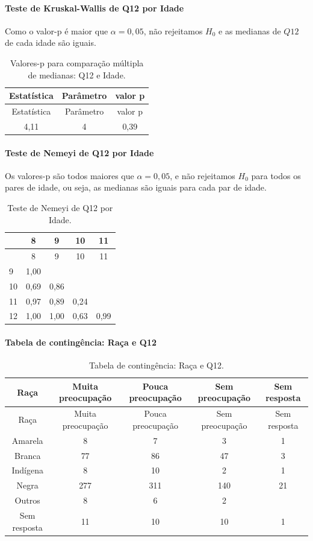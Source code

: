\documentclass[]{article}
\let\oldparagraph\paragraph
\renewcommand{\paragraph}[1]{\oldparagraph{#1}\mbox{}}
\begin{document}
\hypertarget{teste-de-kruskal-wallis-de-q12-por-idade}{%
\paragraph{Teste de Kruskal-Wallis de Q12 por Idade}\label{teste-de-kruskal-wallis-de-q12-por-idade}}

Como o valor-p é maior que \(\alpha=0,05\), não rejeitamos \(H_0\) e as medianas de \(Q12\) de cada idade são iguais.

\begin{longtable}[]{@{}ccc@{}}
\caption{\label{tab:unnamed-chunk-36}Valores-p para comparação múltipla de medianas: Q12 e Idade.}\tabularnewline
\toprule
Estatística & Parâmetro & valor p\tabularnewline
\midrule
\endfirsthead
\toprule
Estatística & Parâmetro & valor p\tabularnewline
\midrule
\endhead
4,11 & 4 & 0,39\tabularnewline
\bottomrule
\end{longtable}

\hypertarget{teste-de-nemeyi-de-q12-por-idade}{%
\paragraph{Teste de Nemeyi de Q12 por Idade}\label{teste-de-nemeyi-de-q12-por-idade}}

Os valores-p são todos maiores que \(\alpha=0,05\), e não rejeitamos \(H_0\) para todos os pares de idade, ou seja, as medianas são iguais para cada par de idade.

\begin{longtable}[]{@{}lcccc@{}}
\caption{\label{tab:unnamed-chunk-37}Teste de Nemeyi de Q12 por Idade.}\tabularnewline
\toprule
& 8 & 9 & 10 & 11\tabularnewline
\midrule
\endfirsthead
\toprule
& 8 & 9 & 10 & 11\tabularnewline
\midrule
\endhead
9 & 1,00 & & &\tabularnewline
10 & 0,69 & 0,86 & &\tabularnewline
11 & 0,97 & 0,89 & 0,24 &\tabularnewline
12 & 1,00 & 1,00 & 0,63 & 0,99\tabularnewline
\bottomrule
\end{longtable}

\cleardoublepage

\hypertarget{tabela-de-continguxeancia-rauxe7a-e-q12}{%
\paragraph{Tabela de contingência: Raça e Q12}\label{tabela-de-continguxeancia-rauxe7a-e-q12}}

\begin{longtable}[]{@{}ccccc@{}}
\caption{\label{tab:unnamed-chunk-38}Tabela de contingência: Raça e Q12.}\tabularnewline
\toprule
Raça & Muita preocupação & Pouca preocupação & Sem preocupação & Sem resposta\tabularnewline
\midrule
\endfirsthead
\toprule
Raça & Muita preocupação & Pouca preocupação & Sem preocupação & Sem resposta\tabularnewline
\midrule
\endhead
Amarela & 8 & 7 & 3 & 1\tabularnewline
Branca & 77 & 86 & 47 & 3\tabularnewline
Indígena & 8 & 10 & 2 & 1\tabularnewline
Negra & 277 & 311 & 140 & 21\tabularnewline
Outros & 8 & 6 & 2 &\tabularnewline
Sem resposta & 11 & 10 & 10 & 1\tabularnewline
\bottomrule
\end{longtable}
\end{document}
